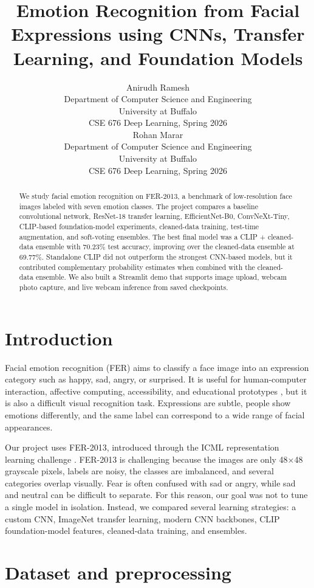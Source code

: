 \documentclass{article}
\title{Emotion Recognition from Facial Expressions using CNNs, Transfer Learning, and Foundation Models}
\author{%
  Anirudh Ramesh \\
  Department of Computer Science and Engineering\\
  University at Buffalo\\
  CSE 676 Deep Learning, Spring 2026\\
  \And
  Rohan Marar \\
  Department of Computer Science and Engineering\\
  University at Buffalo\\
  CSE 676 Deep Learning, Spring 2026\\
}
\begin{document}
\maketitle

\begin{abstract}
We study facial emotion recognition on FER-2013, a benchmark of low-resolution face images labeled with seven emotion classes. The project compares a baseline convolutional network, ResNet-18 transfer learning, EfficientNet-B0, ConvNeXt-Tiny, CLIP-based foundation-model experiments, cleaned-data training, test-time augmentation, and soft-voting ensembles. The best final model was a CLIP + cleaned-data ensemble with 70.23\% test accuracy, improving over the cleaned-data ensemble at 69.77\%. Standalone CLIP did not outperform the strongest CNN-based models, but it contributed complementary probability estimates when combined with the cleaned-data ensemble. We also built a Streamlit demo that supports image upload, webcam photo capture, and live webcam inference from saved checkpoints.
\end{abstract}

\section{Introduction}

Facial emotion recognition (FER) aims to classify a face image into an expression category such as happy, sad, angry, or surprised. It is useful for human-computer interaction, affective computing, accessibility, and educational prototypes \citep{li2020deep}, but it is also a difficult visual recognition task. Expressions are subtle, people show emotions differently, and the same label can correspond to a wide range of facial appearances.

Our project uses FER-2013, introduced through the ICML representation learning challenge \citep{goodfellow2013challenges}. FER-2013 is challenging because the images are only 48$\times$48 grayscale pixels, labels are noisy, the classes are imbalanced, and several categories overlap visually. Fear is often confused with sad or angry, while sad and neutral can be difficult to separate. For this reason, our goal was not to tune a single model in isolation. Instead, we compared several learning strategies: a custom CNN, ImageNet transfer learning, modern CNN backbones, CLIP foundation-model features, cleaned-data training, and ensembles.

\section{Dataset and preprocessing}
\end{document}
